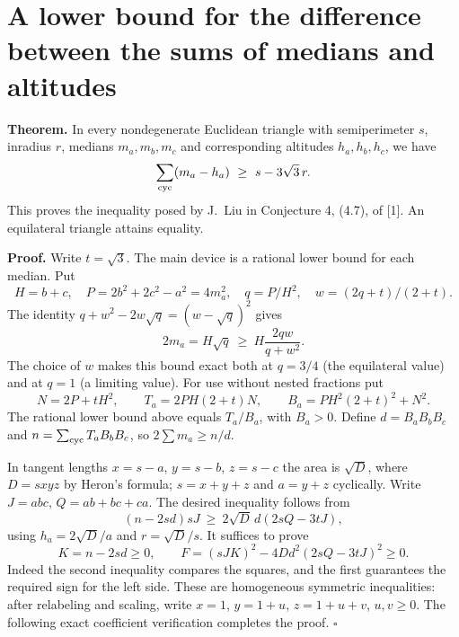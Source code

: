 \documentclass[11pt,a4paper]{article}
\numberwithin{equation}{section}
\theoremstyle{definition}
\theoremstyle{remark}
\begin{document}
\par\endgroup

\begingroup

\section{\texorpdfstring{A lower bound for the difference between the sums of medians and altitudes}{A lower bound for the difference between the sums of medians and altitudes}}\label{section:r39reiwa}
\par\medskip


\textbf{Theorem.} In every nondegenerate Euclidean triangle with semiperimeter
$s$, inradius $r$, medians $m_a,m_b,m_c$ and corresponding altitudes
$h_a,h_b,h_c$, we have
\[
 \sum_{\rm cyc}(m_a-h_a)\ \geq\ s-3\sqrt3\,r .
\]
This proves the inequality posed by J.~Liu in Conjecture 4, (4.7), of [1].
An equilateral triangle attains equality.

\textbf{Proof.} Write $t=\sqrt3$. The main device is a rational lower
bound for each median. Put
\[
 H=b+c,\quad P=2b^2+2c^2-a^2=4m_a^2,\quad
 q=P/H^2,\quad w=(2q+t)/(2+t).
\]
The identity $q+w^2-2w\sqrt q=(w-\sqrt q)^2$ gives
\[
 2m_a=H\sqrt q\ \geq\ H\frac{2qw}{q+w^2}.
\]
The choice of $w$ makes this bound exact both at $q=3/4$ (the equilateral
value) and at $q=1$ (a limiting value). For use without nested fractions put
\[
 N=2P+tH^2,\qquad T_a=2PH(2+t)N,\qquad
 B_a=P H^2(2+t)^2+N^2.
\]
The rational lower bound above equals $T_a/B_a$, with $B_a>0$.
Define $d=B_aB_bB_c$ and $n=\sum_{\rm cyc}T_aB_bB_c$, so
$2\sum m_a\ge n/d$.

In tangent lengths $x=s-a$, $y=s-b$, $z=s-c$ the area is $\sqrt D$,
where $D=sxyz$ by Heron's formula; $s=x+y+z$ and $a=y+z$ cyclically.
Write $J=abc$, $Q=ab+bc+ca$. The desired inequality follows from
\[
 (n-2sd)sJ\ \geq\ 2\sqrt D\,d(2sQ-3tJ),
\]
using $h_a=2\sqrt D/a$ and $r=\sqrt D/s$. It suffices to prove
\[
 K=n-2sd\ge0,\qquad
 F=(sJ K)^2-4Dd^2(2sQ-3tJ)^2\ge0.
\]
Indeed the second inequality compares the squares, and the first guarantees
the required sign for the left side. These are homogeneous symmetric
inequalities: after relabeling and scaling, write
$x=1$, $y=1+u$, $z=1+u+v$, $u,v\ge0$. The following exact coefficient
verification completes the proof. \hfill$\square$
\end{document}
